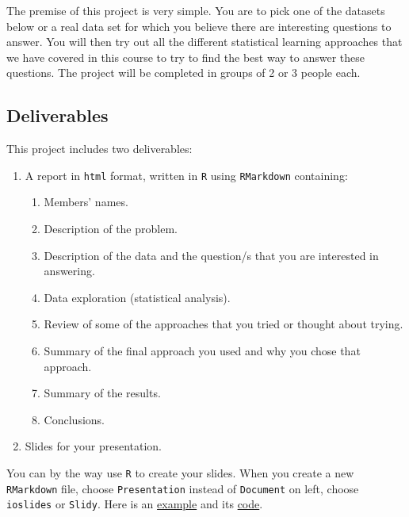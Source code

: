 \documentclass[]{book}
\providecommand{\tightlist}{%
  \setlength{\itemsep}{0pt}\setlength{\parskip}{0pt}}
\begin{document}
The premise of this project is very simple. You are to pick one of the
datasets below or a real data set for which you believe there are
interesting questions to answer. You will then try out all the different
statistical learning approaches that we have covered in this course to
try to find the best way to answer these questions. The project will be
completed in groups of 2 or 3 people each.

\subsection*{Deliverables}\label{deliverables}

This project includes two deliverables:

\begin{enumerate}
\def\labelenumi{\arabic{enumi}.}
\tightlist
\item
  A report in \texttt{html} format, written in \texttt{R} using
  \texttt{RMarkdown} containing:

  \begin{enumerate}
  \def\labelenumii{\alph{enumii}.}
  \tightlist
  \item
    Members' names.
  \item
    Description of the problem.
  \item
    Description of the data and the question/s that you are interested
    in answering.
  \item
    Data exploration (statistical analysis).
  \item
    Review of some of the approaches that you tried or thought about
    trying.
  \item
    Summary of the final approach you used and why you chose that
    approach.
  \item
    Summary of the results.
  \item
    Conclusions.
  \end{enumerate}
\item
  Slides for your presentation.
\end{enumerate}

You can by the way use \texttt{R} to create your slides. When you create
a new \texttt{RMarkdown} file, choose \texttt{Presentation} instead of
\texttt{Document} on left, choose \texttt{ioslides} or \texttt{Slidy}.
Here is an
\href{http://htmlpreview.github.io/?https://github.com/sje30/ioslidesexample/blob/master/ioslidesexample.html\#1}{example}
and its
\href{https://raw.githubusercontent.com/sje30/ioslidesexample/master/ioslidesexample.Rmd}{code}.
\end{document}
